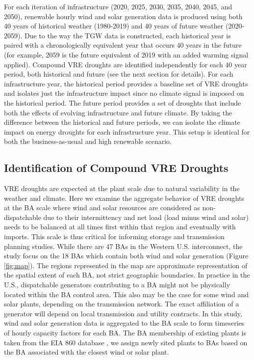\documentclass{agujournal2019}
\begin{document}
For each iteration of infrastructure (2020, 2025, 2030, 2035, 2040, 2045, and 2050), renewable hourly wind and solar generation data is produced using both 40 years of historical weather (1980-2019) and 40 years of future weather (2020-2059). Due to the way the TGW data is constructed, each historical year is paired with a chronologically equivalent year that occurs 40 years in the future (for example, 2059 is the future equivalent of 2019 with an added warming signal applied). Compound VRE droughts are identified independently for each 40 year period, both historical and future (see the next section for details). For each infrastructure year, the historical period provides a baseline set of VRE droughts and isolates just the infrastructure impact since no climate signal is imposed on the historical period. The future period provides a set of droughts that include both the effects of evolving infrastructure and future climate. By taking the difference between the historical and future periods, we can isolate the climate impact on energy droughts for each infrastructure year. This setup is identical for both the business-as-usual and high renewable scenario. 


\subsection{Identification of Compound VRE Droughts}

VRE droughts are expected at the plant scale due to natural variability in the weather and climate. Here we examine the aggregate behavior of VRE droughts at the BA scale where wind and solar resources are considered as non-dispatchable due to their intermittency and net load (load minus wind and solar) needs to be balanced at all times first within that region and eventually with imports. This scale is thus critical for informing storage and transmission planning studies. While there are 47 BAs in the Western U.S. interconnect, the study focus on the 18 BAs which contain both wind and solar generation (Figure \ref{fig:map}). The regions represented in the map are approximate representation of the spatial extent of each BA, not strict geographic boundaries. In practice in the U.S., dispatchable generators contributing to a BA might not be physically located within the BA control area. This also may be the case for some wind and solar plants, depending on the transmission network. The exact affiliation of a generator will depend on local transmission and utility contracts. In this study, wind and solar generation data is aggregated to the BA scale to form timeseries of hourly capacity factors for each BA. The BA membership of existing plants is taken from the EIA 860 database \cite{EIA860}, we assign newly sited plants to BAs based on the BA associated with the closest wind or solar plant. 
\end{document}
